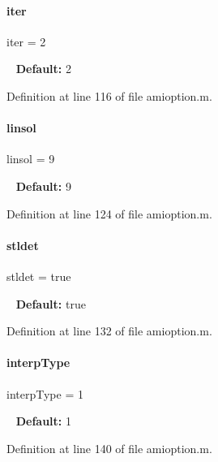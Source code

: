 \paragraph{\texorpdfstring{iter}{iter}}
{\footnotesize\ttfamily iter = 2}

~\newline
{\bfseries Default\+:} 2 

Definition at line 116 of file amioption.\+m.

\mbox{\label{classamioption_a06749b49eaa313f4d00f0115d3a7a7f3}} 
\paragraph{\texorpdfstring{linsol}{linsol}}
{\footnotesize\ttfamily linsol = 9}

~\newline
{\bfseries Default\+:} 9 

Definition at line 124 of file amioption.\+m.

\mbox{\label{classamioption_a202e02f7d8c1a87b1c675bcc1acf1c8e}} 
\paragraph{\texorpdfstring{stldet}{stldet}}
{\footnotesize\ttfamily stldet = true}

~\newline
{\bfseries Default\+:} true 

Definition at line 132 of file amioption.\+m.

\mbox{\label{classamioption_ad06cc805fa18b06ac937fd98a9eba0e7}} 
\paragraph{\texorpdfstring{interp\+Type}{interpType}}
{\footnotesize\ttfamily interp\+Type = 1}

~\newline
{\bfseries Default\+:} 1 

Definition at line 140 of file amioption.\+m.

